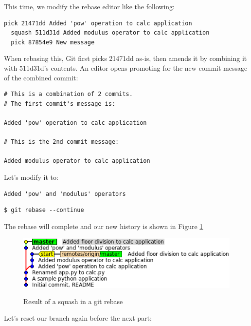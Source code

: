 \documentclass[a4paper]{../../common/tufte-latex/tufte-handout}
\begin{document}
This time, we modify the rebase editor like the following:
\begin{lstlisting}[style=BashInputStyle]
  pick 21471dd Added 'pow' operation to calc application
  squash 511d31d Added modulus operator to calc application
  pick 87854e9 New message
\end{lstlisting}

When rebasing this, Git first picks 21471dd as-is, then amends it by combining it with 511d31d's contents.
An editor opens promoting for the new commit message of the combined commit:
\begin{lstlisting}[style=BashInputStyle]
# This is a combination of 2 commits.
# The first commit's message is:

Added 'pow' operation to calc application

# This is the 2nd commit message:

Added modulus operator to calc application
\end{lstlisting}

Let's modify it to:

\begin{lstlisting}[style=BashInputStyle]
Added 'pow' and 'modulus' operators
\end{lstlisting}

\begin{lstlisting}[style=BashInputStyle]
  $ git rebase --continue
\end{lstlisting}

The rebase will complete and our new history is shown in Figure \ref{fig:gitrebase-squash}

\begin{figure}%
  \centering
  \includegraphics[width=0.75\linewidth]{gitrebase-squash.png}
  \label{fig:gitrebase-squash}
  \caption{Result of a squash in a git rebase}
\end{figure}

Let's reset our branch again before the next part:
\end{document}
